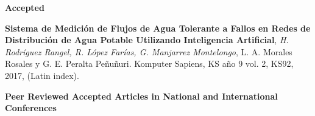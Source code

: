 \documentclass[10pt]{article}
\newenvironment{innerlist}[1][\enskip\textbullet]%
        {\begin{compactitem}[#1]}{\end{compactitem}}
\newcommand{\blankline}{\quad\pagebreak[2]}
\begin{document}
\begin{innerlist}
\blankline

\textbf{Accepted}

\begin{innerlist}


\item \textbf{Sistema de Medición de Flujos de Agua Tolerante a Fallos en Redes de Distribución de Agua Potable Utilizando Inteligencia Artificial}, \textit{H. Rodríguez Rangel, R. López Farías, G. Manjarrez Montelongo}, L. A. Morales Rosales y G. E. Peralta Peñuñuri. Komputer Sapiens, KS año 9 vol. 2, KS92, 2017, (Latin index).

\end{innerlist}

\blankline

\end{innerlist}

\textbf{Peer Reviewed Accepted Articles in National and International Conferences}

\blankline
\end{document}
